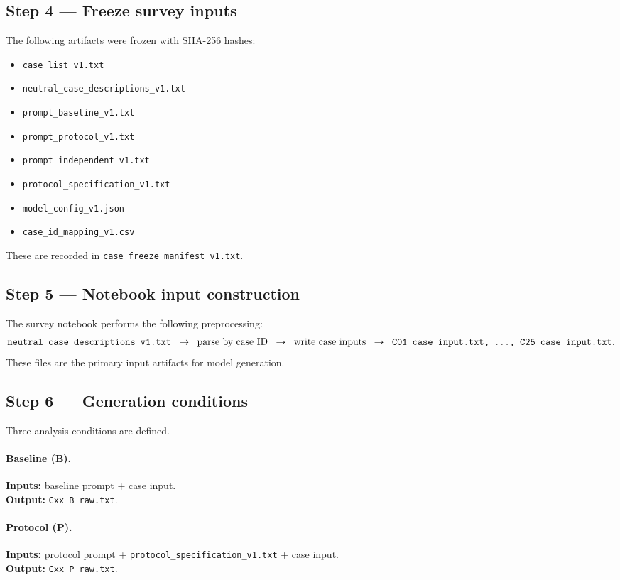 \subsection*{Step 4 --- Freeze survey inputs}
The following artifacts were frozen with SHA-256 hashes:
\begin{itemize}
  \item \texttt{case\_list\_v1.txt}
  \item \texttt{neutral\_case\_descriptions\_v1.txt}
  \item \texttt{prompt\_baseline\_v1.txt}
  \item \texttt{prompt\_protocol\_v1.txt}
  \item \texttt{prompt\_independent\_v1.txt}
  \item \texttt{protocol\_specification\_v1.txt}
  \item \texttt{model\_config\_v1.json}
  \item \texttt{case\_id\_mapping\_v1.csv}
\end{itemize}
These are recorded in \texttt{case\_freeze\_manifest\_v1.txt}.

\subsection*{Step 5 --- Notebook input construction}
The survey notebook performs the following preprocessing:
\[
\texttt{neutral\_case\_descriptions\_v1.txt}
\;\;\rightarrow\;\;
\text{parse by case ID}
\;\;\rightarrow\;\;
\text{write case inputs}
\;\;\rightarrow\;\;
\texttt{C01\_case\_input.txt, \dots, C25\_case\_input.txt}.
\]
These files are the primary input artifacts for model generation.

\subsection*{Step 6 --- Generation conditions}
Three analysis conditions are defined.

\paragraph{Baseline (B).}
\textbf{Inputs:} baseline prompt + case input.\\
\textbf{Output:} \texttt{Cxx\_B\_raw.txt}.

\paragraph{Protocol (P).}
\textbf{Inputs:} protocol prompt + \texttt{protocol\_specification\_v1.txt} + case input.\\
\textbf{Output:} \texttt{Cxx\_P\_raw.txt}.

